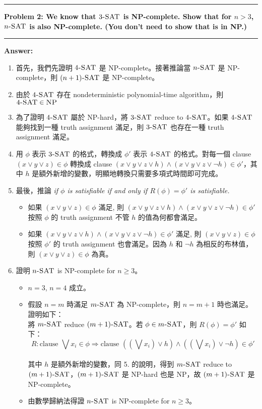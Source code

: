 \documentclass[11pt]{article}
\newcommand\question[2]{\vspace{.25in}\hrule\textbf{#1: #2}\vspace{.5em}\hrule\vspace{.10in}}
\renewcommand\part[1]{\vspace{.10in}\textbf{#1}}
\begin{document}
\question{Problem 2}{We know that $3\textsc{-SAT}$ is NP-complete. Show that for $n > 3$, $n\textsc{-SAT}$ is also NP-complete. (You don't need to show that is in NP.)}

\part{Answer:}

\begin{enumerate}
	\item 首先，我們先證明 $4\textsc{-SAT}$ 是 NP-complete。接著推論當 $n\textsc{-SAT}$ 是 NP-complete，則 $(n+1)\textsc{-SAT}$ 是 NP-complete。
	\item 由於 $4\textsc{-SAT}$ 存在 nondeterministic polynomial-time algorithm，則 $4\textsc{-SAT} \in \textsc{NP}$ 
	\item 為了證明 $4\textsc{-SAT}$ 屬於 NP-hard，將 $3\textsc{-SAT}$ reduce to $4\textsc{-SAT}$。如果 $4\textsc{-SAT}$ 能夠找到一種 truth assignment 滿足，則 $3\textsc{-SAT}$ 也存在一種 truth assignment 滿足。
	\item 用 $\phi$ 表示 $3\textsc{-SAT}$ 的格式，轉換成 ${\phi}'$ 表示 $4\textsc{-SAT}$ 的格式。對每一個 clause $(x \vee y \vee z) \in \phi$ 轉換成 clause $(x \vee y \vee z \vee h) \wedge (x \vee y \vee z \vee \lnot h) \in {\phi}'$，其中 $h$ 是額外新增的變數，明顯地轉換只需要多項式時間即可完成。
	\item 最後，推論 \textit{if $\phi$ is satisfiable if and only if $R(\phi) = {\phi}'$ is satisfiable.}
		\begin{itemize}
			\item
			 如果 $(x \vee y \vee z) \in \phi$ 滿足, 則 $(x \vee y \vee z \vee h) \wedge (x \vee y \vee z \vee \lnot h) \in {\phi}'$ 按照 $\phi$ 的 truth assignment 不管 $h$ 的值為何都會滿足。
			 \item
			 如果 $(x \vee y \vee z \vee h) \wedge (x \vee y \vee z \vee \lnot h) \in {\phi}'$ 滿足, 則 $(x \vee y \vee z) \in \phi$ 按照 ${\phi}'$ 的 truth assignment 也會滿足。因為 $h$ 和 $\lnot h$ 為相反的布林值，則 $(x \vee y \vee z) \in \phi$ 為真。
		\end{itemize}
	\item
		證明 $n\textsc{-SAT}$ is NP-complete for $n \ge 3$。
		\begin{itemize}
			\item $n = 3$, $n = 4$ 成立。
			\item 假設 $n = m$ 時滿足 $m\textsc{-SAT}$ 為 NP-complete，則 $n = m+1$ 時也滿足。證明如下： \\
				將 $m\textsc{-SAT}$ reduce $(m+1)\textsc{-SAT}$。若 $\phi \in m\textsc{-SAT}$，則 $R(\phi) = {\phi}'$ 如下： \\
				$$R: \text{clause } \bigvee x_i \in \phi \Rightarrow \text{clause } \left ( \left ( \bigvee x_i \right ) \vee h \right ) \wedge \left ( \left ( \bigvee x_i \right ) \vee \lnot h \right ) \in {\phi}'$$ \\
				
				其中 $h$ 是額外新增的變數，同 5. 的說明，得到 $m\textsc{-SAT}$ reduce to $(m+1)\textsc{-SAT}$，$(m+1)\textsc{-SAT}$ 是 NP-hard 也是 NP，故 $(m+1)\textsc{-SAT}$ 是 NP-complete。
			\item 由數學歸納法得證 $n\textsc{-SAT}$ is NP-complete for $n \ge 3$。
		\end{itemize}
\end{enumerate}
\end{document}
